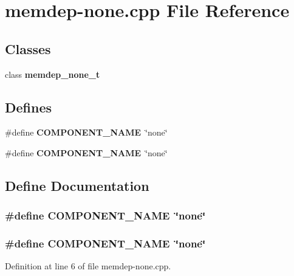 \section{memdep-none.cpp File Reference}
\label{memdep-none_8cpp}
\subsection*{Classes}
\begin{CompactItemize}
\item 
class {\bf memdep\_\-none\_\-t}
\end{CompactItemize}
\subsection*{Defines}
\begin{CompactItemize}
\item 
\#define {\bf COMPONENT\_\-NAME}~\char`\"{}none\char`\"{}
\item 
\#define {\bf COMPONENT\_\-NAME}~\char`\"{}none\char`\"{}
\end{CompactItemize}


\subsection{Define Documentation}
\subsubsection[{COMPONENT\_\-NAME}]{\setlength{\rightskip}{0pt plus 5cm}\#define COMPONENT\_\-NAME~\char`\"{}none\char`\"{}}\label{zesto-memdep_8cpp_9146ade7ce24e3db226a973a59063892}


\subsubsection[{COMPONENT\_\-NAME}]{\setlength{\rightskip}{0pt plus 5cm}\#define COMPONENT\_\-NAME~\char`\"{}none\char`\"{}}\label{memdep-none_8cpp_9146ade7ce24e3db226a973a59063892}




Definition at line 6 of file memdep-none.cpp.